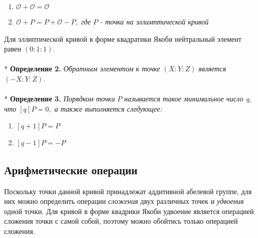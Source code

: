 \documentclass[12pt]{article}
\begin{document}
\begin{enumerate}
\item $\mathcal{O} + \mathcal{O} = \mathcal{O}$
\item $\mathcal{O} + P = P + \mathcal{O} - P,$ \textit{где} $P$ \textit{- точка на эллимптической кривой}
\end{enumerate}
Для эллиптической кривой в форме квадратики Якоби нейтральный элемент равен $(0 : 1 : 1)$. \\
\\*
\textbf{Определение 2.} \textit{Обратным элементом к точке} $(X : Y : Z)$ \textit{является} $(-X : Y : Z)$. \\
\\*
\textbf{Определение 3.} \textit{Порядком точки} $P$ \textit{называется такое минимальное число q, что} $[q]P = 0,$ \textit{а также выполняется следующее:}
\begin{enumerate}
\item $[q + 1]P = P$
\item $[q - 1]P = - P$
\end{enumerate}

\subsection{Арифметические операции}
Поскольку точки данной кривой принадлежат аддитивной абелевой группе, для них можно определить операции \textit{сложения} двух различных точек и \textit{удвоения} одной точки. Для кривой в форме квадрики Якоби удвоение является операцией сложения точки с самой собой, поэтому можно обойтись только операцией сложения.
\end{document}
